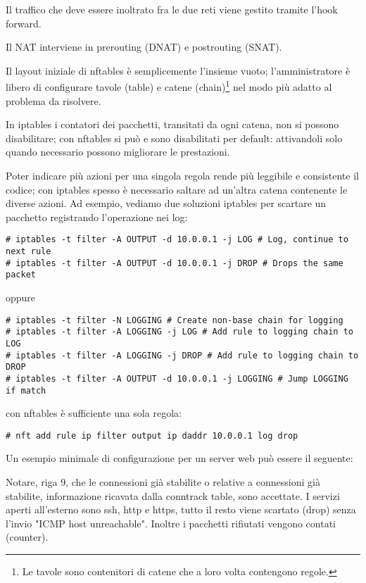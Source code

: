 Il traffico che deve essere inoltrato fra le due reti viene gestito tramite
l'hook forward.

Il NAT interviene in prerouting (DNAT) e postrouting (SNAT).

Il layout iniziale di nftables \`e semplicemente l'insieme vuoto;
l'amministratore \`e libero di configurare tavole (table) e catene
(chain)\footnote{Le tavole sono contenitori di catene che a loro volta
contengono regole.} nel modo pi\`u adatto al problema da risolvere.

In iptables i contatori dei pacchetti, transitati da ogni catena, non si
possono disabilitare; con nftables si pu\`o e sono disabilitati per default:
attivandoli solo quando necessario possono migliorare le prestazioni.

Poter indicare pi\`u azioni per una singola regola rende pi\`u leggibile e
consistente il codice; con iptables spesso è necessario saltare ad un'altra
catena contenente le diverse azioni. Ad esempio, vediamo due soluzioni
iptables per scartare un pacchetto registrando l'operazione
nei log: 

\begin{lstlisting}
# iptables -t filter -A OUTPUT -d 10.0.0.1 -j LOG # Log, continue to next rule
# iptables -t filter -A OUTPUT -d 10.0.0.1 -j DROP # Drops the same packet
\end{lstlisting}
oppure 
\begin{lstlisting}
# iptables -t filter -N LOGGING # Create non-base chain for logging
# iptables -t filter -A LOGGING -j LOG # Add rule to logging chain to LOG
# iptables -t filter -A LOGGING -j DROP # Add rule to logging chain to DROP
# iptables -t filter -A OUTPUT -d 10.0.0.1 -j LOGGING # Jump LOGGING if match
\end{lstlisting}
con nftables \`e sufficiente una sola regola:
\begin{lstlisting}
# nft add rule ip filter output ip daddr 10.0.0.1 log drop
\end{lstlisting}
Un esempio minimale di configurazione per un server web pu\`o essere
il seguente:

Notare, riga 9, che le connessioni già stabilite o relative a
connessioni già stabilite, informazione ricavata dalla conntrack table,
sono accettate.
I servizi aperti all'esterno sono ssh, http e https, tutto il resto
viene scartato (drop) senza l'invio "ICMP host unreachable". Inoltre i
pacchetti rifiutati vengono contati (counter).

